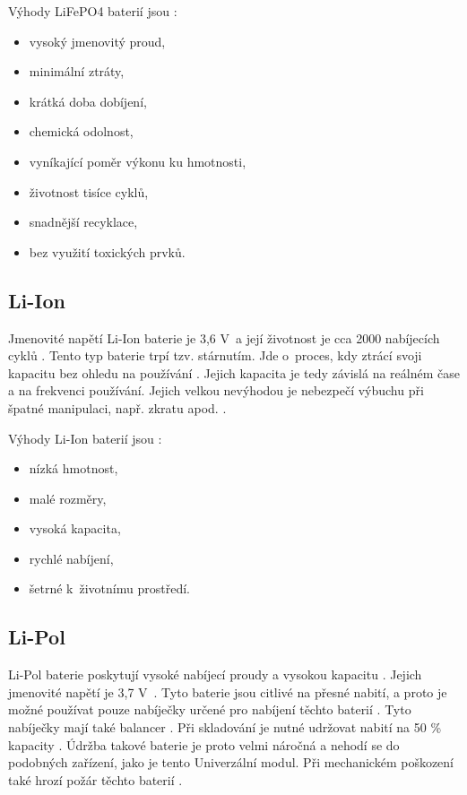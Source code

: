 Výhody LiFePO4 baterií jsou \cite{LiFePO4_smart}:
\begin{itemize}
  \item vysoký jmenovitý proud,
  \item minimální ztráty,
  \item krátká doba dobíjení,
  \item chemická odolnost,
  \item vyníkající poměr výkonu ku hmotnosti,
  \item životnost tisíce cyklů,
  \item snadnější recyklace,
  \item bez využití toxických prvků.
\end{itemize}

\subsection{Li-Ion}
Jmenovité napětí Li-Ion baterie je 3,6 V~a její životnost je cca 2000 nabíjecích cyklů \cite{Li-Ion}. Tento typ baterie trpí tzv. stárnutím. Jde o~proces, kdy ztrácí 
svoji kapacitu bez ohledu na používání \cite{Li-Ion}. Jejich kapacita je tedy závislá na reálném čase a na frekvenci používání. Jejich velkou nevýhodou je nebezpečí 
výbuchu při špatné manipulaci, např. zkratu apod. \cite{Li-Ion}. 

Výhody Li-Ion baterií jsou \cite{Li-Ion}:
\begin{itemize}
  \item nízká hmotnost,
  \item malé rozměry,
  \item vysoká kapacita,
  \item rychlé nabíjení,
  \item šetrné k~životnímu prostředí. 
\end{itemize}

\subsection{Li-Pol}
Li-Pol baterie poskytují vysoké nabíjecí proudy a vysokou kapacitu \cite{akumulatory}. Jejich jmenovité napětí je 3,7 V~\cite{akumulatory}. Tyto baterie jsou citlivé na 
přesné nabití, a proto 
je možné používat pouze nabíječky určené pro nabíjení těchto baterií \cite{akumulatory}. Tyto nabíječky mají také balancer \cite{akumulatory}. Při skladování je nutné 
udržovat nabití na 50 \% kapacity \cite{akumulatory}. Údržba takové baterie je proto velmi náročná a nehodí se do podobných zařízení, jako je tento Univerzální modul. Při 
mechanickém poškození také hrozí požár těchto baterií \cite{akumulatory}.

